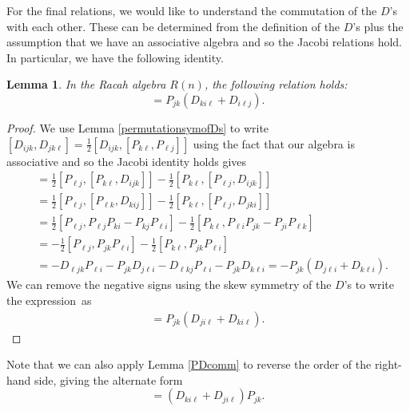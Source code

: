 \documentclass[10pt,a4paper]{amsart}
\numberwithin{equation}{section}
\newtheorem{Lemma}[Theorem]{Lemma}
\begin{document}
For the final relations, we would like to understand the commutation of the $D$'s with each other. These can be determined from the definition of the $D$'s plus the assumption that we have an associative algebra and so the Jacobi relations hold. In particular, we have the following identity.

\begin{Lemma} \label{DDlemma}
In the Racah algebra $R(n)$, the following relation holds:
\begin{equation}
[D_{ijk}, D_{jk\ell}] = P_{jk}\left(D_{ki\ell} +D_{i\ell j}\right).\label{DD}
\end{equation}
\end{Lemma}
\begin{proof}
 We use Lemma \ref{permutationsymofDs} to write
$ [D_{ijk}, D_{jk\ell}] =\frac12 [D_{ijk}, [ P_{k\ell}, P_{\ell j}]]$
using the fact that our algebra is associative and so the Jacobi identity holds gives
\begin{align*}
 [D_{ijk}, D_{jk\ell}] &= \tfrac12[ P_{\ell j}, [P_{k\ell}, D_{ijk}]]- \tfrac12[P_{k\ell}, [ P_{\ell j}, D_{ijk}]] \\
&= \tfrac12 [ P_{\ell j}, [P_{\ell k }, D_{kij}]]-\tfrac12 [P_{k\ell}, [ P_{\ell j}, D_{jki}]] \\
&= \tfrac12[ P_{\ell j}, P_{\ell j} P_{ki} -P_{kj}P_{\ell i}] - \tfrac12 [P_{k\ell}, P_{\ell i}P_{jk}- P_{j i}P_{\ell k}]\\
&= -\tfrac12[ P_{\ell j}, P_{jk}P_{\ell i}] - \frac12 [P_{k\ell}, P_{jk}P_{\ell i}] \\
&= -D_{\ell j k}P_{\ell i}- P_{jk} D_{j \ell i} - D_{\ell k j} P_{\ell i} -P_{jk} D_{k \ell i}
= -P_{jk} ( D_{j \ell i} +D_{k\ell i}).
\end{align*}
We can remove the negative signs using the skew symmetry of the $D$'s to write the expression~as
\begin{gather*}
[D_{ijk}, D_{jk\ell}] = P_{jk}\left( D_{ji\ell} +D_{k i\ell }\right).%
\tag*{\qed}
\end{gather*} \renewcommand{\qed}{}
\end{proof}

Note that we can also apply Lemma \ref{PDcomm} to reverse the order of the right-hand side, giving the alternate form
\begin{equation}
[D_{ijk}, D_{jk\ell}] = \left(D_{ki\ell} +D_{ji\ell }\right)P_{jk}. \label{DDop}
\end{equation}
\end{document}
